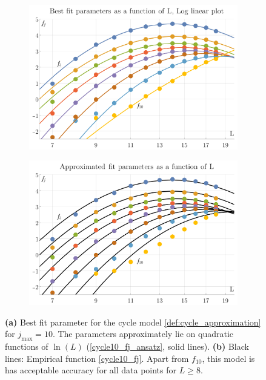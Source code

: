 \documentclass[11pt]{scrartcl}
\numberwithin{equation}{section}
\begin{document}
\begin{figure}[htb]
	\begin{subfigure}{ .49 \linewidth}
		\centering
		\includegraphics[width=\linewidth]{figures/cycle10_parameters}
		\subcaption{}
		\label{fig:cycle10_parameters}
	\end{subfigure}
	\begin{subfigure}{ .49 \linewidth}
		\centering
		\includegraphics[width=\linewidth]{figures/cycle10_parameters_approximation}
		\subcaption{}
		\label{fig:cycle10_parameters_approximation}
	\end{subfigure}
	
	\caption{\textbf{(a)} Best fit parameter for the cycle model \cref{def:cycle_approximation} for $j_\text{max}=10$. The parameters approximately lie on quadratic functions of $\ln (L)$ (\cref{cycle10_fj_ansatz}, solid lines). \textbf{(b)} Black lines: Empirical function \cref{cycle10_fj}. Apart from $f_{10}$, this model is has acceptable accuracy for all data points for $L \geq 8$. }
	
\end{figure}
\end{document}
